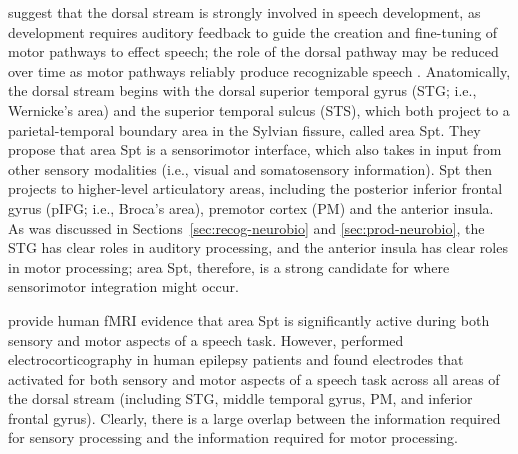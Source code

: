 \citet{hickok2007}
suggest that the dorsal stream
is strongly involved in
speech development,
as development requires auditory feedback
to guide the creation and fine-tuning
of motor pathways to effect speech;
the role of the dorsal pathway may
be reduced over time as motor pathways
reliably produce recognizable speech
\citep{schmidt1975,doyon2003}.
Anatomically, the dorsal stream begins with
the dorsal superior temporal gyrus (STG; i.e., Wernicke's area)
and the superior temporal sulcus (STS),
which both project to
a parietal-temporal boundary area in the Sylvian fissure,
called area Spt.
They propose that area Spt is a sensorimotor interface,
which also takes in input from other sensory modalities
(i.e., visual and somatosensory information).
Spt then projects to higher-level articulatory areas,
including the posterior inferior frontal gyrus (pIFG; i.e., Broca's area),
premotor cortex (PM) and the anterior insula.
As was discussed in
Sections~\ref{sec:recog-neurobio}
and \ref{sec:prod-neurobio},
the STG has clear roles in auditory processing,
and the anterior insula has clear roles in
motor processing;
area Spt, therefore, is a strong candidate
for where sensorimotor integration might occur.

\citet{hickok2009}
provide human fMRI evidence that
area Spt is significantly active
during both sensory and motor aspects
of a speech task.
However, \citet{cogan2014}
performed electrocorticography
in human epilepsy patients
and found electrodes that activated
for both sensory and motor aspects
of a speech task across all areas
of the dorsal stream
(including STG, middle temporal gyrus, PM,
and inferior frontal gyrus).
Clearly, there is a large overlap
between the information required for
sensory processing and the information required
for motor processing.

